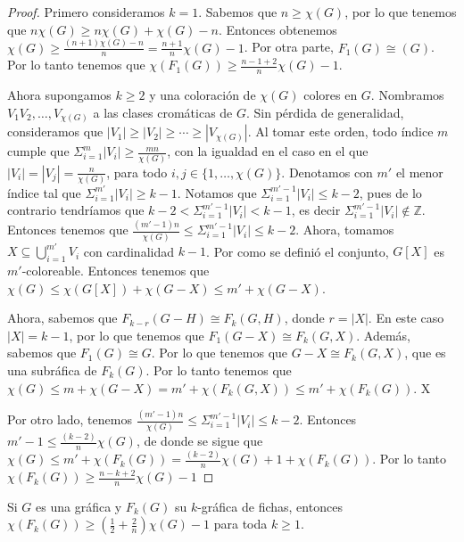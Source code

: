         \begin{proof}
        Primero consideramos $k=1$. Sabemos que $n \geq \chi(G)$, por lo que
        tenemos que $n\chi(G) \geq n\chi(G) + \chi(G) -n$. Entonces obtenemos
        $\chi (G) \geq \frac{(n+1)\chi(G)-n}{n} = \frac{n+1}{n}\chi (G) -1$.
        Por otra parte, $F_1(G) \cong (G)$. Por lo tanto tenemos que
        $\chi(F_1(G)) \geq \frac{n-1+2}{n} \chi(G) -1$.
        
            Ahora supongamos $k \geq 2$ y una coloraci\'on de $\chi(G)$ colores
            en $G$. Nombramos $V_1 V_2, \dots, V_{\chi(G)}$ a las clases
            crom\'aticas de $G$. Sin p\'erdida de generalidad, consideramos que
            $|V_1|\geq |V_2|\geq \cdots \geq |V_{\chi(G)}|$. Al tomar este
            orden, todo \'indice $m$ cumple que $\Sigma_{i=1}^{m}|V_i| \geq
            \frac{mn}{\chi(G)}$, con la igualdad en el caso en el que $|V_i| =
            |V_j| = \frac{n}{\chi(G)}$, para todo $i,j \in \{1, \dots,
            \chi(G)\}$. Denotamos con $m'$ el menor \'indice tal que
            $\Sigma_{i=1}^{m'}|V_i| \geq k-1$. Notamos que
            $\Sigma_{i=1}^{m'-1}|V_i| \leq k-2$, pues de lo contrario
            tendr\'iamos que $k-2<\Sigma_{i=1}^{m'-1}|V_i| < k-1$, es decir
            $\Sigma_{i=1}^{m'-1}|V_i| \notin \mathbb{Z}$. Entonces tenemos que
            $\frac{(m'-1)n}{\chi(G)}\leq \Sigma_{i=1}^{m'-1}|V_i| \leq k-2$.
            Ahora, tomamos $X \subseteq \bigcup_{i=1}^{m'} V_i$ con cardinalidad
            $k-1$. Por como se defini\'o el conjunto, $G[X]$ es $m'$-coloreable.
            Entonces tenemos que  $\chi(G) \leq \chi(G[X])+\chi(G-X) \leq m' +
            \chi(G-X)$.
        
            Ahora, sabemos que $F_{k-r}(G-H) \cong F_k(G,H)$, donde $r = |X|$.
            En este caso $|X| = k-1$, por lo que tenemos que $F_1(G-X) \cong
            F_k(G,X)$. Adem\'as, sabemos que $F_1(G) \cong G$. Por lo que
            tenemos que $G-X \cong F_k(G,X)$, que es una subr\'afica de
            $F_k(G)$. Por lo tanto tenemos que $\chi(G) \leq m + \chi(G-X) = m'
            + \chi(F_k(G,X)) \leq m' + \chi(F_k(G))$. X
            
            Por otro lado, tenemos $\frac{(m'-1)n}{\chi(G)}\leq
            \Sigma_{i=1}^{m'-1}|V_i| \leq k-2$. Entonces $m'-1 \leq
            \frac{(k-2)}{n}\chi(G)$, de donde se sigue que $\chi(G) \leq m' +
            \chi(F_k(G)) = \frac{(k-2)}{n}\chi(G) +1 + \chi(F_k(G))$. Por lo
            tanto $\chi(F_k(G)) \geq \frac{n-k+2}{n} \chi(G) -1$
        \end{proof}
    \begin{teorema}
    \label{relacion num cromatico indep k}
        Si $G$ es una gr\'afica y $F_k(G)$ su $k$-gr\'afica de fichas, entonces
        $\chi (F_k(G)) \geq (\frac{1}{2}+ \frac{2}{n})\chi(G) -1 $ para toda $k
        \geq 1$.
    \end{teorema}
    
